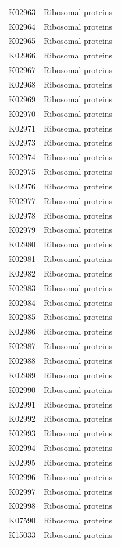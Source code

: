 \begin{longtable}{@{}l l@{}}
K02963 & Ribosomal proteins \\
K02964 & Ribosomal proteins \\
K02965 & Ribosomal proteins \\
K02966 & Ribosomal proteins \\
K02967 & Ribosomal proteins \\
K02968 & Ribosomal proteins \\
K02969 & Ribosomal proteins \\
K02970 & Ribosomal proteins \\
K02971 & Ribosomal proteins \\
K02973 & Ribosomal proteins \\
K02974 & Ribosomal proteins \\
K02975 & Ribosomal proteins \\
K02976 & Ribosomal proteins \\
K02977 & Ribosomal proteins \\
K02978 & Ribosomal proteins \\
K02979 & Ribosomal proteins \\
K02980 & Ribosomal proteins \\
K02981 & Ribosomal proteins \\
K02982 & Ribosomal proteins \\
K02983 & Ribosomal proteins \\
K02984 & Ribosomal proteins \\
K02985 & Ribosomal proteins \\
K02986 & Ribosomal proteins \\
K02987 & Ribosomal proteins \\
K02988 & Ribosomal proteins \\
K02989 & Ribosomal proteins \\
K02990 & Ribosomal proteins \\
K02991 & Ribosomal proteins \\
K02992 & Ribosomal proteins \\
K02993 & Ribosomal proteins \\
K02994 & Ribosomal proteins \\
K02995 & Ribosomal proteins \\
K02996 & Ribosomal proteins \\
K02997 & Ribosomal proteins \\
K02998 & Ribosomal proteins \\
K07590 & Ribosomal proteins \\
K15033 & Ribosomal proteins \\

\end{longtable}
